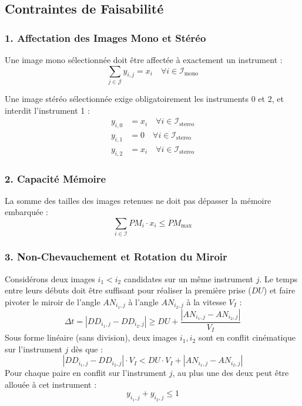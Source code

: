 \subsection{Contraintes de Faisabilité}

\subsubsection{1. Affectation des Images Mono et Stéréo}
Une image mono sélectionnée doit être affectée à exactement un instrument :
\begin{equation}
    \sum_{j \in \mathcal{J}} y_{i,j} = x_i \quad \forall i \in \mathcal{I}_{\text{mono}} \label{eq:mono}
\end{equation}

Une image stéréo sélectionnée exige obligatoirement les instruments 0 et 2, et interdit l'instrument 1 :
\begin{align}
    y_{i,0} &= x_i \quad \forall i \in \mathcal{I}_{\text{stereo}} \label{eq:stereo0} \\
    y_{i,1} &= 0 \quad \forall i \in \mathcal{I}_{\text{stereo}} \label{eq:stereo1} \\
    y_{i,2} &= x_i \quad \forall i \in \mathcal{I}_{\text{stereo}} \label{eq:stereo2}
\end{align}

\subsubsection{2. Capacité Mémoire}
La somme des tailles des images retenues ne doit pas dépasser la mémoire embarquée :
\begin{equation}
    \sum_{i \in \mathcal{I}} PM_i \cdot x_i \leq PM_{\max} \label{eq:mem}
\end{equation}

\subsubsection{3. Non-Chevauchement et Rotation du Miroir}
Considérons deux images $i_1 < i_2$ candidates sur un même instrument $j$. Le temps entre leurs débuts doit être suffisant pour réaliser la première prise ($DU$) et faire pivoter le miroir de l'angle $AN_{i_1,j}$ à l'angle $AN_{i_2,j}$ à la vitesse $V_I$ :
\begin{equation}
    \Delta t = |DD_{i_1,j} - DD_{i_2,j}| \geq DU + \frac{|AN_{i_1,j} - AN_{i_2,j}|}{V_I}
\end{equation}
Sous forme linéaire (sans division), deux images $i_1, i_2$ sont en conflit cinématique sur l'instrument $j$ dès que :
\begin{equation}
    |DD_{i_1,j} - DD_{i_2,j}| \cdot V_I < DU \cdot V_I + |AN_{i_1,j} - AN_{i_2,j}| \label{eq:conflit_cond}
\end{equation}
Pour chaque paire en conflit sur l'instrument $j$, au plus une des deux peut être allouée à cet instrument :
\begin{equation}
    y_{i_1,j} + y_{i_2,j} \leq 1 \label{eq:disjonction}
\end{equation}

